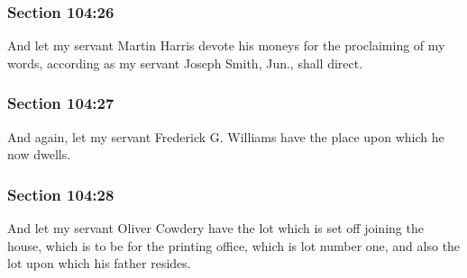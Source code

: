 	\subsubsection{Section 104:26} %
		\label{DC104-26}

		And let my servant Martin Harris devote his moneys for the proclaiming of my words, according as my servant Joseph Smith, Jun., shall direct.


	\subsubsection{Section 104:27} %
		\label{DC104-27}

		And again, let my servant Frederick G. Williams have the place upon which he now dwells.


	\subsubsection{Section 104:28} %
		\label{DC104-28}

		And let my servant Oliver Cowdery have the lot which is set off joining the house, which is to be for the printing office, which is lot number one, and also the lot upon which his father resides.


